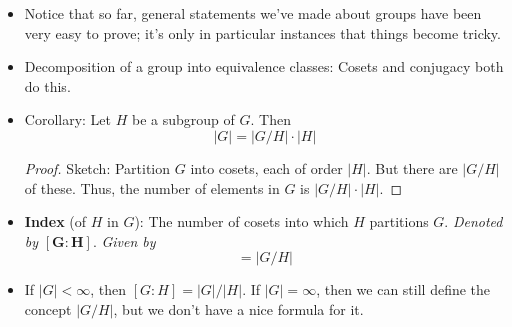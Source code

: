 \documentclass[../notes.tex]{subfiles}
\begin{document}
\begin{itemize}
\begin{proof}
        Claim 1: Let $C_1,C_2\in G/H$. We divide into two cases ($C_1\cap C_2=\emptyset$ and $C_1\cap C_2\neq\emptyset$). In the first case, $C_1,C_2$ are disjoint, as desired. In the latter case, they are not disjoint, so we need to prove that they are the same. Suppose $g\in C_1\cap C_2$. Let $C_1=\gamma H$. We will prove that $gH=\gamma H$ via a bidirectional inclusion argument. It will follow by similar logic that $gH=C_2$, from which transitivity will imply that $C_1=gH=C_2$, as desired. Let's begin. Let $x\in gH$. Then $x=gh$ for some $h\in H$. Additionally, we know that $g\in\gamma H$ by hypothesis, so $g=\gamma h'$ for some $h'\in H$. It follows by combining the last two equations that $x=\gamma h'h$. But since $h'h\in H$, $x\in\gamma H$ as desired. A symmetric argument works in the other direction.\par
        Claim 2: We know that $g\in gH$ since $e\in H$ and $g=ge$. Additionally, if $g\in\gamma H$, we have by part (1) that $\gamma H=gH$, so $g$ does lie in a \emph{unique} coset.\par
        Claim 3: Suppose there exist $h,h'\in H$ such that $gh=gh'$. Then $h=h'$ by the cancellation lemma. Thus, every distinct $h\in H$ induces a distinct $gh\in gH$. Therefore, $|gH|=|H|$, as desired.
    \end{proof}
    \item Notice that so far, general statements we've made about groups have been very easy to prove; it's only in particular instances that things become tricky.
    \item Decomposition of a group into equivalence classes: Cosets and conjugacy both do this.
    \item Corollary: Let $H$ be a subgroup of $G$. Then
    \begin{equation*}
        |G| = |G/H|\cdot|H|
    \end{equation*}
    \begin{proof}
        Sketch: Partition $G$ into cosets, each of order $|H|$. But there are $|G/H|$ of these. Thus, the number of elements in $G$ is $|G/H|\cdot|H|$.
    \end{proof}
    \item \textbf{Index} (of $H$ in $G$): The number of cosets into which $H$ partitions $G$. \emph{Denoted by} $\bm{[G:H]}$. \emph{Given by}
    \begin{equation*}
        [G:H] = |G/H|
    \end{equation*}
    \item If $|G|<\infty$, then $[G:H]=|G|/|H|$. If $|G|=\infty$, then we can still define the concept $|G/H|$, but we don't have a nice formula for it.

\end{itemize}
\end{document}
